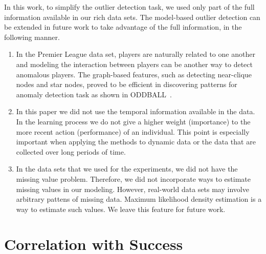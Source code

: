 {\begin{enumerate}
	In this work, to simplify the outlier detection task, we used only part of the full information available in our rich data sets. The model-based outlier detection can be extended in future work to take advantage of the full information, in the following manner. 
	\begin{enumerate}
		\item In the Premier League data set, players are naturally related to one another and modeling the interaction between players can be another way to detect anomalous players.
		The graph-based features, such as detecting near-clique nodes and star nodes, proved to be efficient in discovering patterns for anomaly detection task as shown in ODDBALL~\citep{Akoglu2010}.
		\item In this paper we did not use the temporal information available in the data. In the learning process we do not give a higher weight (importance) to the more recent action (performance) of an individual. This point is especially important when applying the methods to dynamic data or the data that are collected over long periods of time. 
		\item In the data sets that we used for the experiments, we did not have the missing value problem. Therefore, we did not incorporate ways to estimate missing values in our modeling. However, real-world data sets may involve arbitrary pattens of missing data. Maximum likelihood density estimation is a way to estimate such values. We leave this feature for future work.
	\end{enumerate}
		\end{enumerate}

\section{Correlation with Success}
\label{sec:success}


}
